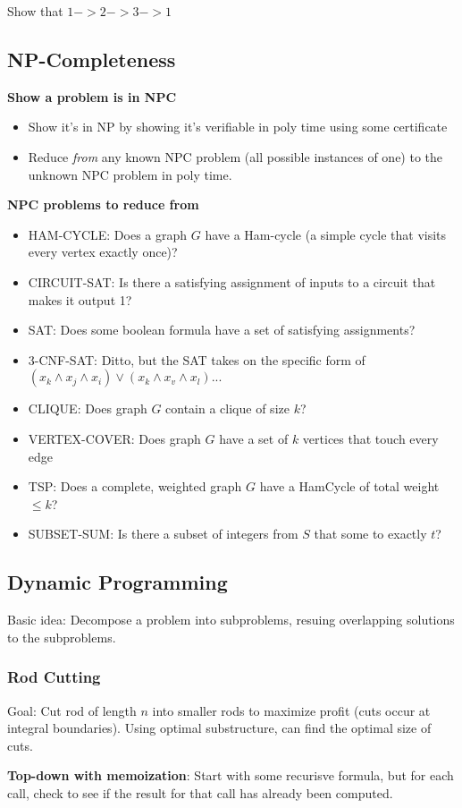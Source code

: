\documentclass[7pt]{article}
\begin{document}
\begin{multicols*}{4}
\begin{itemize}
  Show that $1->2->3->1$
\end{itemize}
\subsection*{NP-Completeness}

{\bf Show a problem is in NPC}
\begin{itemize}
\item Show it's in NP by showing it's verifiable in poly time using
  some certificate
\item Reduce \emph{from} any known NPC problem (all possible instances
  of one) to the unknown NPC problem in poly time.
\end{itemize}

{\bf NPC problems to reduce from}
\begin{itemize}
\item HAM-CYCLE: Does a graph $G$ have a Ham-cycle (a simple cycle
  that visits every vertex exactly once)?
\item CIRCUIT-SAT: Is there a satisfying assignment of inputs to a
  circuit that makes it output 1?
\item SAT: Does some boolean formula have a set of satisfying assignments?
\item 3-CNF-SAT: Ditto, but the SAT takes on the specific form of
  $(x_k \wedge x_j \wedge x_i) \vee (x_k \wedge x_v \wedge x_l) ...$
\item CLIQUE: Does graph $G$ contain a clique of size $k$?
\item VERTEX-COVER: Does graph $G$ have a set of $k$ vertices that
  touch every edge
\item TSP: Does a complete, weighted graph $G$ have a HamCycle of
  total weight $\leq k$?
\item SUBSET-SUM: Is there a subset of integers from $S$ that some to
  exactly $t$? 
\end{itemize}

\subsection*{Dynamic Programming}
Basic idea: Decompose a problem into subproblems, resuing overlapping
solutions to the subproblems.

\subsubsection*{Rod Cutting}
Goal: Cut rod of length $n$ into smaller rods to maximize profit (cuts
occur at integral boundaries).  Using optimal substructure, can find
the optimal size of cuts.

{\bf Top-down with memoization}: Start with some recurisve formula, but
for each call, check to see if the result for that call has already
been computed.
\end{multicols*}
\end{document}
